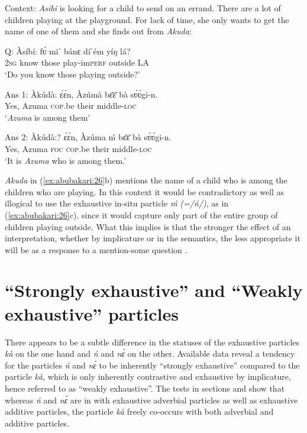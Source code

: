 \documentclass[output=paper,modfonts,nonflat,
\ChapterDOI{10.5281/zenodo.3367154}
 hidelinks
]{langsci/langscibook}
\begin{document}
 
\ea\label{ex:abubakari:26} 
Context: \textit{Asibi} is looking for a child to send on an errand. There are a lot of children playing at the playground. For lack of time, she only wants to get the name of one of them and she finds out from \textit{Akuda}:
 
\ea\label{ex:abubakari:26a}
Q: Àsíbí: \gll fʋ̀  mīˈ  bánɛ  díˈém    yíŋ lá?\\
2\textsc{sg}  know  those  play-im\textsc{perf}  outside LA\\
\glt ‘Do you know those playing outside?’

\ex\label{ex:abubakari:26b} 
Ans 1: Àkúdà: \gll ɛ́ɛ́n,  Àzúmà  bɛ̄ɛ̄    bà sʋ́ʋ́gi-n. \\
Yes,  Azuma  \textsc{cop}.be    their middle-\textsc{loc}\\
\glt ‘\textit{Azuma} is among them’
 
\ex\label{ex:abubakari:26c}
Ans 2: Àkúdà:? \gll ɛ́ɛ́n,  Àzúma  ḿ  bɛ̄ɛ̄ bà  sʋ́ʋ́gi-n.\\
Yes,  Azuma  \textsc{foc}  \textsc{cop}.be   their  middle-\textsc{loc}\\
\glt ‘It is \textit{Azuma} who is among them.’
\z
\z

\textit{Akuda} in (\ref{ex:abubakari:26}b) mentions the name of a child who is among the children who are playing. In this context it would be contradictory as well as illogical to use the exhaustive in-situ  particle \textit{ḿ (=/ń/)}, as in (\ref{ex:abubakari:26}c), since it would capture only part of the entire group of children playing outside. What this implies is that the stronger the effect of an  interpretation, whether by implicature or in the semantics, the less appropriate it will be as a response to a mention-some question \citep[see][10]{vanderWal2013}.

\section{``Strongly exhaustive'' and  ``Weakly exhaustive'' particles}

There appears to be a subtle difference in the statuses of the exhaustive particles \textit{kà} on the one hand and \textit{ń} and \textit{nɛ́} on the other. Available data reveal a tendency for the particles \textit{ń} and \textit{nɛ́} to be inherently ``strongly exhaustive'' compared to the particle \textit{kà}, which is only inherently contrastive and exhaustive by implicature, hence referred to as ``weakly exhaustive''. The tests in sections  and  show that whereas \textit{ń} and \textit{nɛ́} are in  with exhaustive adverbial particles as well as exhaustive additive particles, the particle \textit{kà} freely co-occurs with both adverbial and additive particles. 
\end{document}
